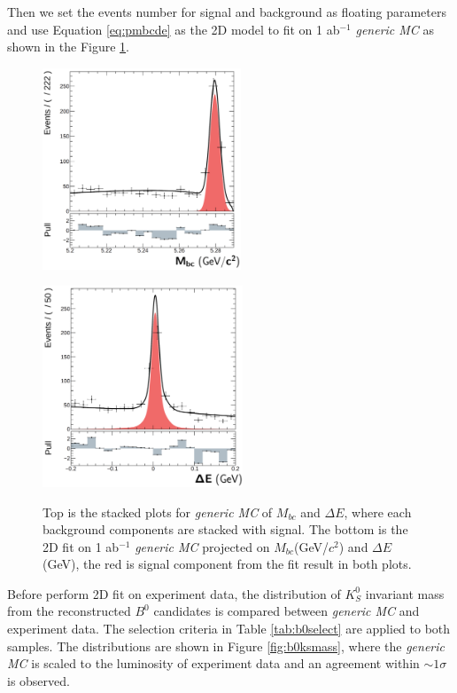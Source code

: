 Then we set the events number for signal and background as floating parameters and use Equation \ref{eq:pmbcde} as the 2D model to fit on 1 ab$^{-1}$ \textit{generic MC} as shown in the Figure \ref{fig:2Dgen}.

\begin{figure}[htpb]
	\begin{minipage}[b]{0.5\linewidth}
		\centering 
		\includegraphics[height=6cm]{figures/mbc_data_fit}
		\label{}
	\end{minipage}
	\begin{minipage}[b]{0.5\linewidth}
		\centering 
		\includegraphics[height=6cm]{figures/de_data_fit}
		\label{}
	\end{minipage}
	\caption{Top is the stacked plots for \textit{generic MC} of $M_{bc}$ and $\Delta E$, where each background components are stacked with signal. The bottom is the 2D fit on 1 ab$^{-1}$ \textit{generic MC} projected on $M_{bc}$(GeV/$c^2$) and $\Delta E$(GeV), the red is signal component from the fit result in both plots.}
	\label{fig:2Dgen}
\end{figure}

Before perform 2D fit on experiment data, the distribution of $K_S^0$ invariant mass from the reconstructed $B^0$ candidates is compared between \textit{generic MC} and experiment data. The selection criteria in Table \ref{tab:b0select} are applied to both samples. The distributions are shown in Figure \ref{fig:b0ksmass}, where the \textit{generic MC} is scaled to the luminosity of experiment data and an agreement within $\sim 1\sigma$ is observed. 


